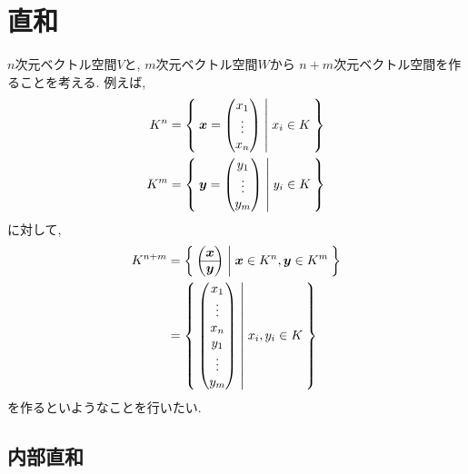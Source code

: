 \section{直和}

$n$次元ベクトル空間$V$と,
$m$次元ベクトル空間$W$から
$n+m$次元ベクトル空間を作ることを考える.
例えば,
\begin{align*}
  K^n&=\Set{\boldsymbol{x}=\begin{pmatrix}x_1\\\vdots\\x_n\end{pmatrix}|x_i\in K}\\
  K^m&=\Set{\boldsymbol{y}=\begin{pmatrix}y_1\\\vdots\\y_m\end{pmatrix}|y_i\in K}
\end{align*}
に対して,
\begin{align*}
  K^{n+m}
  &=\Set{\begin{pmatrix}\boldsymbol{x}\\\hline\boldsymbol{y}\end{pmatrix}|\boldsymbol{x}\in K^n,\boldsymbol{y}\in K^m}\\
  &=\Set{\begin{pmatrix}x_1\\\vdots\\x_n\\y_1\\\vdots\\y_m\end{pmatrix}|x_i,y_i\in K}
\end{align*}
を作るといようなことを行いたい.

\subsection{内部直和}


